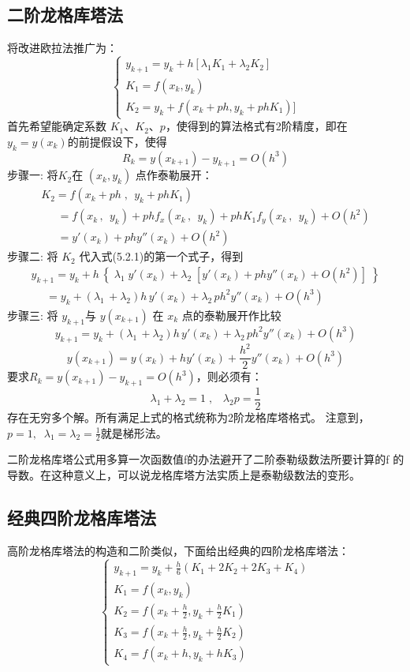 \documentclass[a4paper,12pt]{article}
\begin{document}
\subsection{二阶龙格库塔法}
将改进欧拉法推广为：
\begin{equation}
\left\{ \begin{array}{l}
y_{k + 1}=y_k + h[\lambda_1 K_1+\lambda_2 K_2]\\
K_1=f(x_k,y_k)\\
K_2= y_k + f(x_k + ph, y_k +phK_1)]
\end{array} \right.
\end{equation}
首先希望能确定系数 $K_1$、$K_2$、$p$，使得到的算法格式有2阶精度，即在${y_k} = y(x_k)$的前提假设下，使得
\[{R_k} = y({x_{k + 1}}) - {y_{k + 1}} = O({h^3})\]
步骤一: 将$K_2$在 $(x_k,y_k)$ 点作泰勒展开：
\[\begin{array}{l}
K_2= f({x_k} + ph\;,\,\;{y_k} + ph{K_1})\\
\ \ \quad= f({x_k}\,,\,\;{y_k}) + ph{f_x}({x_k}\,,\,\;{y_k}) + ph{K_1}{f_y}({x_k}\,,\,\;{y_k}) + O({h^2})\\
\ \ \quad= y'({x_k}) + phy''({x_k}) + O({h^2})
\end{array}\]
步骤二: 将 $K_2$ 代入式(5.2.1)的第一个式子，得到
\[\begin{array}{l}
{y_{k + 1}} = {y_k} + h\,\left\{ {\;{\lambda _1}\;y'({x_k}) + {\lambda _2}\;[y'({x_k}) + phy''({x_k}) + O({h^2})]\;} \right\}\\
\ \ \ \ \ \ = {y_k} + ({\lambda _1}\, + {\lambda _2})h\,y'({x_k}) + {\lambda _2}\,p{h^2}y''({x_k}) + O({h^3})
\end{array}\]
步骤三: 将 $y_{k+1}$与 $y(x_{k+1})$ 在 $x_k$ 点的泰勒展开作比较
\[{y_{k + 1}} = {y_k} + ({\lambda _1}\, + {\lambda _2})h\,y'({x_k}) + {\lambda _2}\,p{h^2}y''({x_k}) + O({h^3})\]
\[y({x_{k + 1}}) = y({x_k}) + hy'({x_k}) + \frac{{{h^2}}}{2}y''({x_k}) + O({h^3})\]
要求${R_k} = y({x_{k+ 1}}) - {y_{k + 1}} = O({h^3})$，则必须有：
\[{\lambda _1} + {\lambda _2} = 1\;,\;\;\;{\lambda _2}p = \frac{1}{2}\]
存在无穷多个解。所有满足上式的格式统称为2阶龙格库塔格式。
注意到，$p = 1,\;\;{\lambda _1} = {\lambda _2} = \frac{1}{2}$就是梯形法。\par
二阶龙格库塔公式用多算一次函数值f的办法避开了二阶泰勒级数法所要计算的f 的导数。在这种意义上，可以说龙格库塔方法实质上是泰勒级数法的变形。

\subsection{经典四阶龙格库塔法}
高阶龙格库塔法的构造和二阶类似，下面给出经典的四阶龙格库塔法：
\[\left\{ {\begin{array}{*{20}{l}}
{{y_{k + 1}} = {y_k} + \frac{h}{6}({K_1} + 2{K_2} + 2{K_3} + {K_4})}\\
{{K_1} = f({x_k},{y_k})\quad \quad \quad \quad \quad \quad \quad \quad \;\;}\\
{{K_2} = f({x_k} + \frac{h}{2},{y_k} + \frac{h}{2}{K_1})\quad \quad \quad \quad }\\
{{K_3} = f({x_k} + \frac{h}{2},{y_k} + \frac{h}{2}{K_2})\quad \quad \quad \quad }\\
{{K_4} = f({x_k} + h,{y_k} + h{K_3})\quad \quad \quad \quad \quad }
\end{array}} \right.\]
\end{document}
